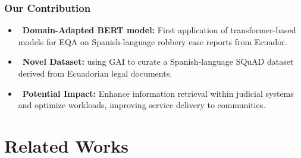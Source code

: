 \documentclass{beamer}
\begin{document}
\begin{frame}
    \frametitle{Our Contribution}
    \begin{itemize}
    \item \faLaptopCode\ \textbf{Domain-Adapted BERT model:} First
      application of transformer-based models for \ac{EQA} on
      Spanish-language robbery case reports from Ecuador.
    \item \faDatabase\ \textbf{Novel Dataset:} using \ac{GAI} to
      curate a Spanish-language \ac{SQuAD} dataset derived from
      Ecuadorian legal documents.
    \item \faServer\ \textbf{Potential Impact:} Enhance information
      retrieval within judicial systems and optimize workloads,
      improving service delivery to communities.
    \end{itemize}
\end{frame}

\section{Related Works}
\label{sec:related-works}

\end{document}
